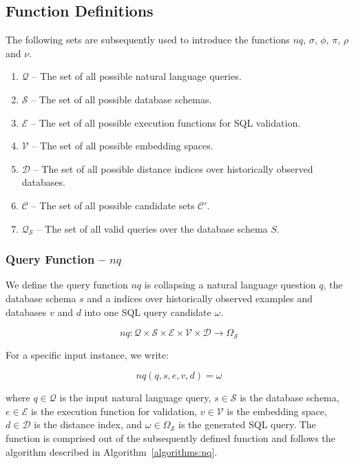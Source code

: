 \subsection{Function Definitions}\label{design:function-definitions}

The following sets are subsequently used to introduce the functions $nq$, $\sigma$, $\phi$, $\pi$, $\rho$ and $\nu$.

\begin{enumerate}
    \item $\mathcal{Q}$ – The set of all possible natural language queries.
    \item $\mathcal{S}$ – The set of all possible database schemas.
    \item $\mathcal{E}$ – The set of all possible execution functions for SQL validation.
    \item $\mathcal{V}$ – The set of all possible embedding spaces.
    \item $\mathcal{D}$ – The set of all possible distance indices over historically observed databases.
    \item $\mathcal{C}$ – The set of all possible candidate sets $\mathcal{C}'$.
    \item $\mathcal{Q}_{\mathcal{S}}$ – The set of all valid queries over the database schema $S$.
\end{enumerate}

\subsubsection{Query Function – $nq$}

We define the query function $nq$ is collapsing a natural language question $q$,
the database schema $s$ and a indices over historically observed examples and
databases $v$ and $d$ into one SQL query candidate $\omega$.

$$
nq: \mathcal{Q} \times \mathcal{S} \times \mathcal{E} \times \mathcal{V} \times \mathcal{D} \rightarrow \Omega_{\mathcal{S}}
$$

\vspace{0.5em}

For a specific input instance, we write:

$$
nq(q, s, e, v, d) = \omega
$$

\vspace{0.5em}

where $q \in \mathcal{Q}$ is the input natural language query, $s \in \mathcal{S}$
is the database schema, $e \in \mathcal{E}$ is the execution function for validation,
$v \in \mathcal{V}$ is the embedding space, $d \in \mathcal{D}$ is the distance index,
and $\omega \in \Omega_{\mathcal{S}}$ is the generated SQL query. The function is comprised
out of the subsequently defined function and follows the algorithm described in Algorithm~\ref{algorithms:nq}.

